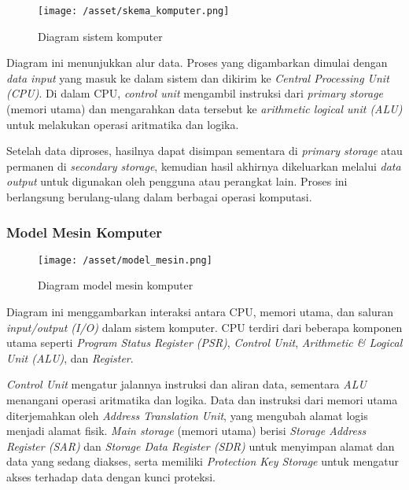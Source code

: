 \documentclass[12pt]{article}
\begin{document}
\begin{figure}[h]
    \centering
    \texttt{[image: /asset/skema\_komputer.png]}
    \caption{Diagram sistem komputer}
\end{figure}

Diagram ini menunjukkan alur data. Proses yang digambarkan dimulai dengan \textit{data input} yang masuk ke dalam sistem dan dikirim ke \textit{Central Processing Unit (CPU)}. Di dalam CPU, \textit{control unit} mengambil instruksi dari \textit{primary storage} (memori utama) dan mengarahkan data tersebut ke \textit{arithmetic logical unit (ALU)} untuk melakukan operasi aritmatika dan logika.\vspace{10pt}

Setelah data diproses, hasilnya dapat disimpan sementara di \textit{primary storage} atau permanen di \textit{secondary storage}, kemudian hasil akhirnya dikeluarkan melalui \textit{data output} untuk digunakan oleh pengguna atau perangkat lain. Proses ini berlangsung berulang-ulang dalam berbagai operasi komputasi.

\subsubsection{Model Mesin Komputer}

\begin{figure}[h]
    \centering
    \texttt{[image: /asset/model\_mesin.png]}
    \caption{Diagram model mesin komputer}
\end{figure}

Diagram ini menggambarkan interaksi antara CPU, memori utama, dan saluran \textit{input/output (I/O)} dalam sistem komputer. CPU terdiri dari beberapa komponen utama seperti \textit{Program Status Register (PSR)}, \textit{Control Unit}, \textit{Arithmetic & Logical Unit (ALU)}, dan \textit{Register}.\vspace{10pt}

\textit{Control Unit} mengatur jalannya instruksi dan aliran data, sementara \textit{ALU} menangani operasi aritmatika dan logika. Data dan instruksi dari memori utama diterjemahkan oleh \textit{Address Translation Unit}, yang mengubah alamat logis menjadi alamat fisik. \textit{Main storage} (memori utama) berisi \textit{Storage Address Register (SAR)} dan \textit{Storage Data Register (SDR)} untuk menyimpan alamat dan data yang sedang diakses, serta memiliki \textit{Protection Key Storage} untuk mengatur akses terhadap data dengan kunci proteksi.\vspace{10pt}
\end{document}
